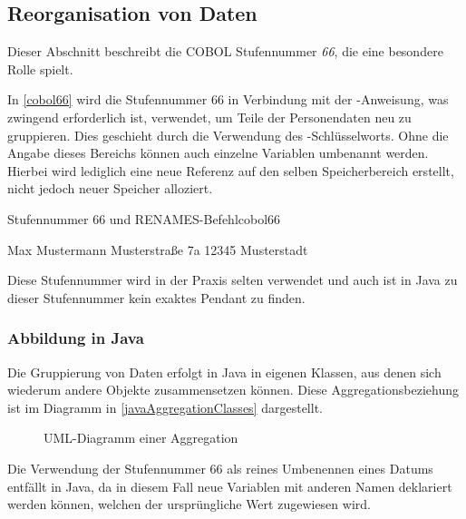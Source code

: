 
\subsection{Reorganisation von Daten}
Dieser Abschnitt beschreibt die COBOL Stufennummer \textit{66}, die eine besondere Rolle spielt.

In \autoref{cobol66} wird die Stufennummer 66 in Verbindung mit der -Anweisung, was zwingend erforderlich ist, verwendet, um Teile der Personendaten neu zu gruppieren. Dies geschieht durch die Verwendung des -Schlüsselworts. Ohne die Angabe dieses Bereichs können auch einzelne Variablen umbenannt werden. Hierbei wird lediglich eine neue Referenz auf den selben Speicherbereich erstellt, nicht jedoch neuer Speicher alloziert.

\begin{codeWithCaption}{Stufennummer 66 und RENAMES-Befehl}{cobol66}
 \cFollow
\begin{shellwindow}
Max       Mustermann
Musterstraße  7a   12345 Musterstadt   
\end{shellwindow}
\end{codeWithCaption}

Diese Stufennummer wird in der Praxis selten verwendet und auch ist in Java zu dieser Stufennummer kein exaktes Pendant zu finden. 
\subsubsection*{Abbildung in Java}
Die Gruppierung von Daten erfolgt in Java in eigenen Klassen, aus denen sich wiederum andere Objekte zusammensetzen können. Diese Aggregationsbeziehung ist im Diagramm in \autoref{javaAggregationClasses} dargestellt. 

\begin{figure}[H]
    \centering
    \caption{UML-Diagramm einer Aggregation}
    \label{javaAggregationClasses}
\end{figure}
Die Verwendung der Stufennummer 66 als reines Umbenennen eines Datums entfällt in Java, da in diesem Fall neue Variablen mit anderen Namen deklariert werden können, welchen der ursprüngliche Wert zugewiesen wird.
